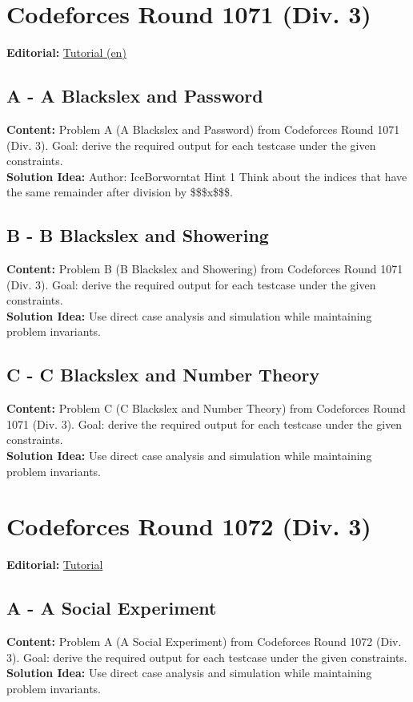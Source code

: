 \documentclass[11pt]{article}
\begin{document}
\section{Codeforces Round 1071 (Div. 3)}
\textbf{Editorial:} \href{https://codeforces.com/blog/entry/149406}{Tutorial (en)}

\subsection{A - A Blackslex and Password}
\textbf{Content:} Problem A (A Blackslex and Password) from Codeforces Round 1071 (Div. 3). Goal: derive the required output for each testcase under the given constraints.\\
\textbf{Solution Idea:} Author: IceBorworntat Hint 1 Think about the indices that have the same remainder after division by \$\$\$x\$\$\$.

\subsection{B - B Blackslex and Showering}
\textbf{Content:} Problem B (B Blackslex and Showering) from Codeforces Round 1071 (Div. 3). Goal: derive the required output for each testcase under the given constraints.\\
\textbf{Solution Idea:} Use direct case analysis and simulation while maintaining problem invariants.

\subsection{C - C Blackslex and Number Theory}
\textbf{Content:} Problem C (C Blackslex and Number Theory) from Codeforces Round 1071 (Div. 3). Goal: derive the required output for each testcase under the given constraints.\\
\textbf{Solution Idea:} Use direct case analysis and simulation while maintaining problem invariants.

\section{Codeforces Round 1072 (Div. 3)}
\textbf{Editorial:} \href{https://codeforces.com/blog/entry/150033}{Tutorial}

\subsection{A - A Social Experiment}
\textbf{Content:} Problem A (A Social Experiment) from Codeforces Round 1072 (Div. 3). Goal: derive the required output for each testcase under the given constraints.\\
\textbf{Solution Idea:} Use direct case analysis and simulation while maintaining problem invariants.
\end{document}

